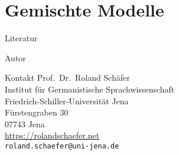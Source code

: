 \documentclass[handout,aspectratio=1610,dvipsnames]{beamer}
\begin{document}
  \section{Gemischte Modelle}
  \let\woopsi\section\let\section\subsection\let\subsection\subsubsection
  
  \let\subsection\section\let\section\woopsi
\fi

\makeatletter
\setcounter{lastpagemainpart}{\the\c@framenumber}
\makeatother

\appendix

\begin{frame}[allowframebreaks]
  {Literatur}
  \renewcommand*{\bibfont}{\footnotesize}
  \printbibliography
\end{frame}

\begin{frame}
  {Autor}
  \begin{block}{Kontakt}
    Prof.\ Dr.\ Roland Schäfer\\
    Institut für Germanistische Sprachwissenschaft\\
    Friedrich-Schiller-Universität Jena\\
    Fürstengraben 30\\
    07743 Jena\\[\baselineskip]
    \url{https://rolandschaefer.net}\\
    \texttt{roland.schaefer@uni-jena.de}
  \end{block}
\end{frame}
\end{document}

